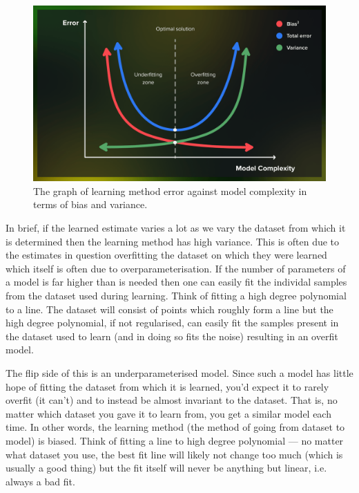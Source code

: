 \documentclass[11pt]{article}
\begin{document}
\begin{figure}[ht]
    \centering
    \includegraphics[width=\columnwidth]{./figures/supervised_learning/bias_variance.png}
    \caption{The graph of learning method error against model complexity in terms of bias and variance.}
    \label{fig:bias_variance}
\end{figure}

In brief, if the learned estimate varies a lot as we vary the dataset from which it is determined then the learning method has high variance. This is often due to the estimates in question overfitting the dataset on which they were learned which itself is often due to overparameterisation. If the number of parameters of a model is far higher than is needed then one can easily fit the individal samples from the dataset used during learning. Think of fitting a high degree polynomial to a line. The dataset will consist of points which roughly form a line but the high degree polynomial, if not regularised, can easily fit the samples present in the dataset used to learn (and in doing so fits the noise) resulting in an overfit model.

The flip side of this is an underparameterised model. Since such a model has little hope of fitting the dataset from which it is learned, you'd expect it to rarely overfit (it can't) and to instead be almost invariant to the dataset. That is, no matter which dataset you gave it to learn from, you get a similar model each time. In other words, the learning method (the method of going from dataset to model) is biased. Think of fitting a line to high degree polynomial — no matter what dataset you use, the best fit line will likely not change too much (which is usually a good thing) but the fit itself will never be anything but linear, i.e. always a bad fit. 
\end{document}

